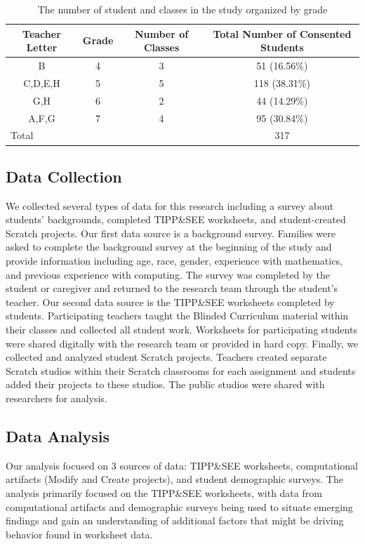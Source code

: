\documentclass[sigconf,manuscript,review,anonymous]{acmart} %
\def\ts{TIPP\&SEE}
\newcommand{\Scratchencore}[0]{Blinded Curriculum}
\begin{document}
\begin{table}
    \centering
\begin{tabular}{| c | c | c | c | } 
      \hline
Teacher Letter & Grade & Number of Classes & Total Number of Consented Students\\ \hline
B & 4 & 3 & 51 (16.56\%) \\ \hline
C,D,E,H & 5 & 5 & 118 (38.31\%) \\ \hline
G,H & 6 & 2 & 44 (14.29\%) \\ \hline
A,F,G & 7 & 4 & 95 (30.84\%) \\ \hline
\multicolumn{3}{|l|}{Total} & 317 \\ \hline
   \end{tabular}

    \caption{The number of student and classes in the study organized by grade}
    \label{tab:student_teacher}
\end{table}

\subsection{Data Collection}
We collected several types of data for this research including a survey about students' backgrounds, completed \ts{} worksheets, and student-created Scratch projects. Our first data source is a background survey. Families were asked to complete the background survey at the beginning of the study and provide information including age, race, gender, experience with mathematics, and previous experience with computing. The survey was completed by the student or caregiver and returned to the research team through the student's teacher. Our second data source is the \ts{} worksheets completed by students. Participating teachers taught the \Scratchencore{} material within their classes and collected all student work. Worksheets for participating students were shared digitally with the research team or provided in hard copy. Finally, we collected and analyzed student Scratch projects. Teachers created separate Scratch studios within their Scratch classrooms for each assignment and students added their projects to these studios. The public studios were shared with researchers for analysis. 

\subsection{Data Analysis}
Our analysis focused on 3 sources of data: \ts{} worksheets, computational artifacts (Modify and Create projects), and student demographic surveys. The analysis primarily focused on the \ts{} worksheets, with data from computational artifacts and demographic surveys being used to situate emerging findings and gain an understanding of additional factors that might be driving behavior found in worksheet data.
\end{document}
